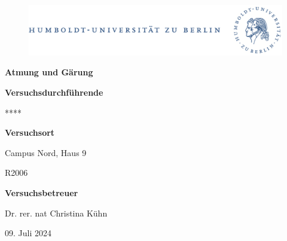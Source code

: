 \documentclass[10pt,a4paper]{article}
\begin{document}
	
	\begin{titlepage}
		\begin{center}
			\begin{figure}[h!tbp]
				\includegraphics[width=\linewidth]{HUlogo.PNG}
			\end{figure}
			\vspace*{2 cm}
			
			\textcolor{Bluetitle}{\textbf{\huge Atmung und Gärung}}\par
			
			\vspace*{2cm}
			
			\textcolor{Greyish}{\textbf{Versuchsdurchführende}}\par
			\textcolor{Greyish}{****}\par

			
			\vspace*{0.5cm}
			\textcolor{Greyish}{\textbf{Versuchsort}}\par
			\textcolor{Greyish}{Campus Nord, Haus 9}\par
			\textcolor{Greyish}{R2006}\par
			\vspace*{0.5cm}
			\textcolor{Greyish}{\textbf{Versuchsbetreuer}}\par
			\textcolor{Greyish}{Dr. rer. nat Christina Kühn}\par
			
			\vspace*{2 cm}
			
			\textcolor{Greyish}{09. Juli 2024}\par
			
			
			
			
		\end{center}
	\end{titlepage}
	
	\tableofcontents
	
\end{document}
